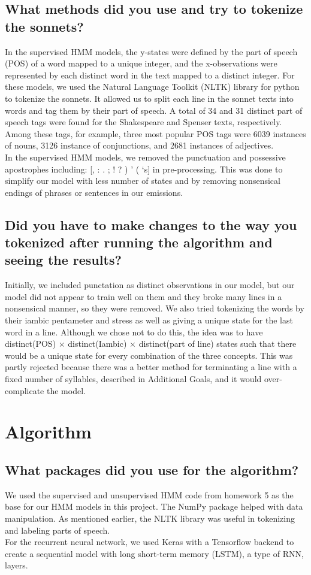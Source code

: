 \subsection{What methods did you use and try to tokenize the sonnets?}
In the supervised HMM models, the y-states were defined by the part of speech (POS) of a word mapped to a unique integer, and the x-observations were represented by each distinct word in the text mapped to a distinct integer. For these models, we used the Natural Language Toolkit (NLTK) library for python to tokenize the sonnets. It allowed us to split each line in the sonnet texts into words and tag them by their part of speech. A total of 34 and 31 distinct part of speech tags were found for the Shakespeare and Spenser texts, respectively. Among these tags, for example, three most popular POS tags were 6039 instances of nouns, 3126 instance of conjunctions, and 2681 instances of adjectives.\\
\indent In the supervised HMM models, we removed the punctuation and possessive apostrophes including: [, : . ; ! ? ) ' ( `s] in pre-processing. This was done to simplify our model with less number of states and by removing nonsensical endings of phrases or sentences in our emissions.
\subsection{Did you have to make changes to the way you tokenized after running the algorithm and seeing the results?}
Initially, we included punctation as distinct observations in our model, but our model did not appear to train well on them and they broke many lines in a nonsensical manner, so they were removed. We also tried tokenizing the words  by their iambic pentameter and stress as well as giving a unique state for the last word in a line. Although we chose not to do this, the idea was to have distinct(POS) $\times$ distinct(Iambic) $\times$ distinct(part of line) states such that there would be a unique state for every combination of the three concepts. This was partly rejected because there was a better method for terminating a line with a fixed number of syllables, described in Additional Goals, and it would over-complicate the model.

\section{Algorithm}
\medskip
\subsection{What packages did you use for the algorithm?}
We used the supervised and unsupervised HMM code from homework 5 as the base for our HMM models in this project. The NumPy package helped with data manipulation. As mentioned earlier, the NLTK library was useful in tokenizing and labeling parts of speech. \\
\indent For the recurrent neural network, we used Keras with a Tensorflow backend to create a sequential model with long short-term memory (LSTM), a type of RNN, layers.
